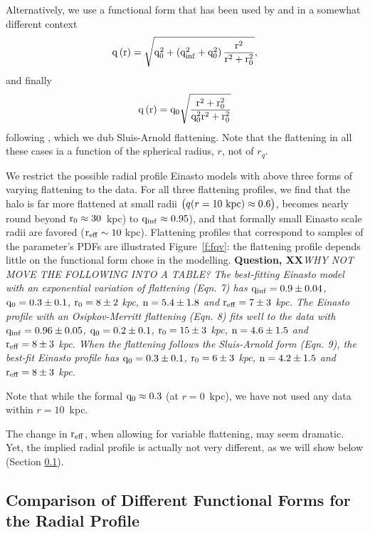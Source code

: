 \documentclass[12pt,preprint]{aastex}
\begin{document}
Alternatively, we use a functional form that has been used by \citep{Osipkov79} and \citep{Merritt85} in a somewhat different context
\begin{equation}
\rm q\left(r\right)=\sqrt{q_0^2+\left(q_{inf}^2+q_0^2\right)\frac{r^2}{r^2+r_0^2}},
\end{equation}
and finally 
\begin{equation}
\rm q\left(r\right)=q_0\sqrt{\frac{r^2+r_0^2}{q_0^2r^2+r_0^2}}
\end{equation}
following \citet{Sluis1998}, which we dub Sluis-Arnold flattening. 
Note that the flattening in all these cases ia a function of the spherical radius, $r$, not of $r_q$.

We restrict the possible radial profile Einasto models with above three forms of varying flattening to the data. For all three flattening profiles, we find that the halo is far more flattened at small radii $\bigl ( q(r=10\rm~kpc)\approx 0.6\bigr )$, becomes nearly round beyond  $\rm r_0\approx 30$~kpc)  to $\rm q_{inf}\approx 0.95$),  and that formally small Einasto scale radii are favored ($\rm r_{eff} \sim 10~$kpc). Flattening profiles that correspond to samples of the parameter's PDFs  are illustrated Figure~\ref{f:fqv}: the flattening profile depends little on the functional form chose in the modelling.  
{\bf Question, XX}\textit{WHY NOT MOVE THE FOLLOWING INTO A TABLE? The best-fitting Einasto model with an exponential variation of flattening (Eqn. 7) has $\rm q_{inf}=0.9\pm0.04$, $\rm q_0=0.3\pm0.1$, $\rm r_0=8\pm2~$kpc, $\rm n=5.4\pm1.8$ and $\rm r_{eff}=7\pm3~$kpc. The Einasto profile with an Osipkov-Merritt flattening (Eqn. 8) fits well to the data with $\rm q_{inf}=0.96\pm0.05$, $\rm q_0=0.2\pm0.1$, $\rm r_0=15\pm3~$kpc, $\rm n=4.6\pm1.5$ and $\rm r_{eff}=8\pm3~$kpc. When the flattening follows the Sluis-Arnold form (Eqn. 9), the best-fit Einasto profile has $\rm q_0=0.3\pm0.1$, $\rm r_0=6\pm3~$kpc, $\rm n=4.2\pm1.5$ and $\rm r_{eff}=8\pm3~$kpc.} 

Note that while the formal $\rm q_0\approx 0.3$ (at $r=0$~kpc), we have not used any data within $r=10$~kpc. 

The change in $\rm r_{eff}$, when allowing for variable flattening, may seem dramatic. Yet,
the implied radial profile is actually not very different, as we will show below (Section \ref{sec:ModelComparison}).


\subsection{Comparison of Different Functional Forms for the Radial Profile}\label{sec:ModelComparison}
\end{document}
